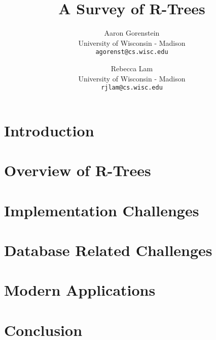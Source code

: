 \documentclass[10pt, twocolumn, draft]{article}
\title{A Survey of R-Trees}
\author{
	Aaron Gorenstein\\
	University of Wisconsin - Madison\\
	\texttt{agorenst@cs.wisc.edu}
	\and
	Rebecca Lam\\
	University of Wisconsin - Madison\\
	\texttt{rjlam@cs.wisc.edu}
}
\begin{document}
\maketitle
\thispagestyle{empty}



\section{Introduction}
\label{sec:intro}


\section{Overview of R-Trees}
\label{sec:overview}


\section{Implementation Challenges}
\label{sec:impchal}


\section{Database Related Challenges}
\label{sec:dbchal}


\section{Modern Applications}
\label{sec:apps}


\section{Conclusion}
\label{sec:conc}


%
%
\end{document}
